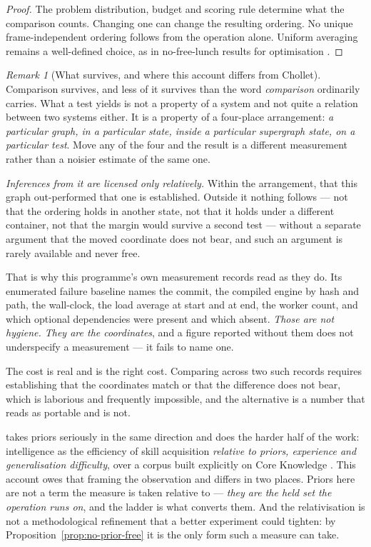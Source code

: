 \documentclass[11pt,a4paper]{article}
\theoremstyle{remark}
\newtheorem{remark}[definition]{Remark}
\begin{document}
\begin{proof}
The problem distribution, budget and scoring rule determine what the
comparison counts. Changing one can change the resulting ordering. No
unique frame-independent ordering follows from the operation alone.
Uniform averaging remains a well-defined choice, as in no-free-lunch
results for optimisation \citep{wolpert1997}.
\end{proof}

\begin{remark}[What survives, and where this account differs from Chollet]\label{rem:chollet}
Comparison survives, and less of it survives than the word \emph{comparison} ordinarily carries.
What a test yields is not a property of a system and not quite a relation between two systems either.
It is a property of a four-place arrangement: \emph{a particular graph, in a particular state, inside a
particular supergraph state, on a particular test}. Move any of the four and the result is a different
measurement rather than a noisier estimate of the same one.

\emph{Inferences from it are licensed only relatively.} Within the arrangement, that this graph
out-performed that one is established. Outside it nothing follows --- not that the ordering holds in
another state, not that it holds under a different container, not that the margin would survive a
second test --- without a separate argument that the moved coordinate does not bear, and such an
argument is rarely available and never free.

That is why this programme's own measurement records read as they do. Its enumerated failure baseline
names the commit, the compiled engine by hash and path, the wall-clock, the load average at start and
at end, the worker count, and which optional dependencies were present and which absent. \emph{Those
are not hygiene. They are the coordinates}, and a figure
reported without them does not underspecify a measurement --- it fails to name one.

The cost is real and is the right cost. Comparing across two such records requires establishing that
the coordinates match or that the difference does not bear, which is laborious and frequently
impossible, and the alternative is a number that reads as portable and is not.

\citet{chollet2019} takes priors seriously in the same direction and does the harder half of the work:
intelligence as the efficiency of skill acquisition \emph{relative to priors, experience and
generalisation difficulty}, over a corpus built explicitly on Core Knowledge \citep{spelke2006}. This
account owes that framing the observation and differs in two places. Priors here are not a term the
measure is taken relative to --- \emph{they are the held set the operation runs on}, and the ladder is
what converts them. And the relativisation is not a methodological refinement that a better experiment
could tighten: by Proposition~\ref{prop:no-prior-free} it is the only form such a measure can take.


\end{remark}
\end{document}
